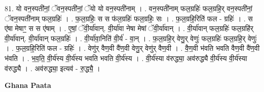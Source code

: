\documentclass[17pt]{extarticle}
\begin{document}
81. यो वन॒स्पती॑नां॒ ॅवन॒स्पती॑नां॒ ॅयो यो वन॒स्पती॑नाम् । . वन॒स्पती॑नाम् फल॒ग्रहिः॑ फल॒ग्रहि॒र् वन॒स्पती॑नां॒ ॅवन॒स्पती॑नाम् फल॒ग्रहिः॑ । . फ॒ल॒ग्रहिः॒ स स फ॑ल॒ग्रहिः॑ फल॒ग्रहिः॒ सः । . फ॒ल॒ग्रहि॒रिति॑ फल - ग्रहिः॑ । . स ए॑षा मेषाꣳ॒॒ स स ए॑षाम् । . ए॒षां॒ ॅवी॒र्या॑वान्. वी॒र्या॑वा नेषा मेषां ॅवी॒र्या॑वान् । . वी॒र्या॑वान् फल॒ग्रहिः॑ फल॒ग्रहि॑र् वी॒र्या॑वान्. वी॒र्या॑वान् फल॒ग्रहिः॑ । . वी॒र्या॑वा॒निति॑ वी॒र्य॑ - वा॒न् । . फ॒ल॒ग्रहि॒र् वेणु॒र् वेणुः॑ फल॒ग्रहिः॑ फल॒ग्रहि॒र् वेणुः॑ । . फ॒ल॒ग्रहि॒रिति॑ फल - ग्रहिः॑ । . वेणु॑र् वैण॒वी वै॑ण॒वी वेणु॒र् वेणु॑र् वैण॒वी । . वै॒ण॒वी भ॑वति भवति वैण॒वी वै॑ण॒वी भ॑वति । . भ॒व॒ति॒ वी॒र्य॑स्य वी॒र्य॑स्य भवति भवति वी॒र्य॑स्य । . वी॒र्य॑स्या व॑रुद्ध्या॒ अव॑रुद्ध्यै वी॒र्य॑स्य वी॒र्य॑स्या व॑रुद्ध्यै । . अव॑रुद्ध्या॒ इत्यव॑ - रु॒द्ध्यै॒ । \newline

\textbf{Ghana Paata } \newline
\end{document}
